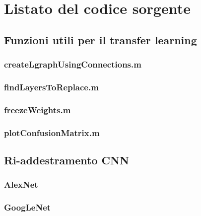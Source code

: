 \chapter{Listato del codice sorgente}
\label{sorgenti}


\section{Funzioni utili per il transfer learning}

\subsection{createLgraphUsingConnections.m}

\vspace{3mm}

\subsection{findLayersToReplace.m}

\vspace{3mm}

\subsection{freezeWeights.m}

\vspace{3mm}

\subsection{plotConfusionMatrix.m}



\section{Ri-addestramento CNN}

\subsection{AlexNet}

\vspace{3mm}

\subsection{GoogLeNet}

\vspace{3mm}

